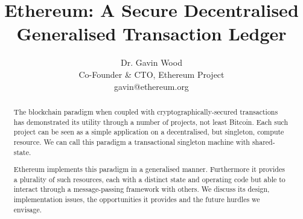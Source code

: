 \documentclass[9pt,oneside]{amsart}
\title{Ethereum: A Secure Decentralised Generalised Transaction Ledger}
\author{
    Dr. Gavin Wood\\
    Co-Founder \& CTO, Ethereum Project\\
    gavin@ethereum.org
}
\begin{document}
\pagecolor{lightyellow}

\begin{abstract}
The blockchain paradigm when coupled with cryptographically-secured transactions has demonstrated its utility through a number of projects, not least Bitcoin. Each such project can be seen as a simple application on a decentralised, but singleton, compute resource. We can call this paradigm a transactional singleton machine with shared-state.

Ethereum implements this paradigm in a generalised manner. Furthermore it provides a plurality of such resources, each with a distinct state and operating code but able to interact through a message-passing framework with others. We discuss its design, implementation issues, the opportunities it provides and the future hurdles we envisage.
\end{abstract}

\maketitle
\end{document}
